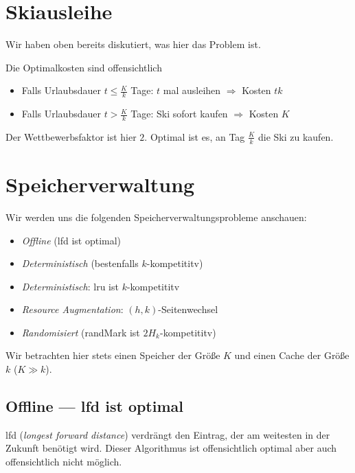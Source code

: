 \section{Skiausleihe}

Wir haben oben bereits diskutiert, was hier das Problem ist.

Die Optimalkosten sind offensichtlich
\begin{itemize}
  \item Falls Urlaubsdauer \( t \leq \frac{K}{k} \) Tage: \( t \) mal ausleihen \( \Rightarrow \) Kosten \( tk \)
  \item Falls Urlaubsdauer \( t > \frac{K}{k} \) Tage: Ski sofort kaufen \( \Rightarrow \) Kosten \( K \)
\end{itemize}

Der Wettbewerbsfaktor ist hier \( 2 \). Optimal ist es, an Tag \( \frac{K}{k} \) die Ski zu kaufen.


\section{Speicherverwaltung}

Wir werden uns die folgenden Speicherverwaltungsprobleme anschauen:

\begin{itemize}
  \item \emph{Offline} (lfd ist optimal)
  \item \emph{Deterministisch} (bestenfalls \( k \)-kompetititv)
  \item \emph{Deterministisch}: lru ist \( k \)-kompetititv
  \item \emph{Resource Augmentation}: \( (h,k) \)-Seitenwechsel
  \item \emph{Randomisiert} (randMark ist \( 2H_k \)-kompetititv)
\end{itemize}

Wir betrachten hier stets einen Speicher der Größe \( K \) und einen Cache der Größe \( k \) (\( K \gg k \)).

\subsection{Offline --- lfd ist optimal}

lfd (\emph{longest forward distance}) verdrängt den Eintrag, der am weitesten in der Zukunft benötigt wird. Dieser Algorithmus ist offensichtlich optimal aber auch offensichtlich nicht möglich.

